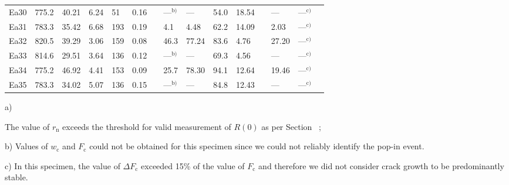 \documentclass[12pt,onecolumn]{article}
\makeatletter
\DeclareRobustCommand*{\nameref}[1]{%
      \emph{\myorg@nameref{#1}}%
    }%
\makeatother
\begin{document}
\begin{bibunit}
\begin{table}
{\begin{threeparttable}[t]
\begin{tabular}{rllllllllllllll}
Ea30 & 775.2 & 40.21 & 6.24 &   51 & 0.16 &  & ---$^\text{b)}$ & --- &54.0 & 18.54 &  & --- &---$^\text{c)}$\\ 
Ea31 & 783.3 & 35.42 & 6.68 &  193 & 0.19 &  &  4.1 & 4.48 & 62.2 & 14.09 &  & 2.03 &---$^\text{c)}$\\ 
Ea32 & 820.5 & 39.29 & 3.06 &  159 & 0.08 &  & 46.3 & 77.24 & 83.6 & 4.76 &  & 27.20 &---$^\text{c)}$\\ 
Ea33 & 814.6 & 29.51 & 3.64 &  136 & 0.12 &  & ---$^\text{b)}$ & --- &69.3 & 4.56 &  & --- &---$^\text{c)}$\\ 
Ea34 & 775.2 & 46.92 & 4.41 &  153 & 0.09 &  & 25.7 & 78.30 & 94.1 & 12.64 &  & 19.46 &---$^\text{c)}$\\ 
Ea35 & 783.3 & 34.02 & 5.07 &  136 & 0.15 &  & ---$^\text{b)}$ & --- &84.8 & 12.43 &  & --- &---$^\text{c)}$\\ 

\bottomrule
\end{tabular}
\begin{tablenotes}
\item[a)] {\footnotesize The value of $r_\mathrm{n}$ exceeds the threshold for valid measurement of $R(0)$ as per Section~\nameref{sec:Gc};
\item[b)] Values of $w_\mathrm{c}$ and $F_\mathrm{c}$ could not be obtained for this specimen since we could not reliably identify the pop-in event.
\item[c)] In this specimen, the value of $\Delta F_\mathrm{c}$ exceeded 15\% of the value of $F_\mathrm{c}$ and therefore we did not consider crack growth to be predominantly stable.}
\end{tablenotes}
\end{threeparttable}
}
\end{table}

\restoregeometry


\thispagestyle{empty}


\end{bibunit}
\end{document}
